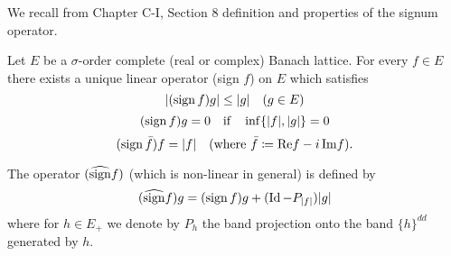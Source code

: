We recall from Chapter C-I, Section 8 definition and properties of the signum operator.
\begin{proposition}\label{prop:c2-2.1}
%
%
%
Let $E$ be a $\sigma$-order complete (real or complex) Banach lattice.
For every $f \in E$ there exists a unique linear operator (sign $f$) on $E$ which satisfies
\begin{equation}\label{eq:c2-2.1}
	|(\operatorname{sign} f)g| \leq |g| \quad (g \in E)
\end{equation}
\begin{equation}\label{eq:c2-2.2}
(\operatorname{sign} f)g = 0 \quad \text{if} \quad \inf\{|f|,|g|\} = 0
\end{equation}
\begin{equation}\label{eq:c2-2.3}
(\operatorname{sign} \bar{f})f = |f| \quad \text{(where } \bar{f} \coloneqq \mathop{}\!\mathrm{Re} f - i\mathop{}\!\mathrm{Im} f \text{)}.
\end{equation}
\end{proposition}
The operator $(\widehat{\operatorname{sign}} f)$ (which is non-linear in general) is defined by
\begin{equation}\label{eq:c2-2.4}
(\widehat{\operatorname{sign}}f)g = (\operatorname{sign} f)g + (\operatorname{Id} - P_{|f|})|g|
\end{equation}
where for $h \in E_{+}$ we denote by $P_h$ the band projection onto the band $\{h\}^{dd}$ generated by $h$.

